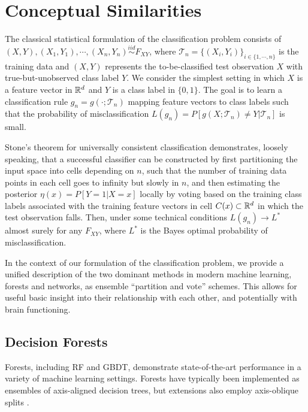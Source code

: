 
\section{Conceptual Similarities}
The classical statistical formulation of the classification problem consists of $(X,Y), (X_1,Y_1), \cdots, (X_n,Y_n) \stackrel{iid}{\sim} F_{XY}$, where $\mathcal{T}_n = \{(X_i,Y_i)\}_{i \in \{1,\cdots,n\}}$ is the training data and $(X,Y)$ represents the to-be-classified test observation $X$ with true-but-unobserved class label $Y$. We consider the simplest setting in which $X$ is a feature vector in $\mathbb{R}^d$ and $Y$ is a class label in $\{0,1\}$. The goal is to learn a classification rule $g_n = g(\cdot;\mathcal{T}_n)$ mapping feature vectors to class labels such that the probability of misclassification $L(g_n) = P[g(X;\mathcal{T}_n) \neq Y|\mathcal{T}_n]$ is small.

Stone's theorem for universally consistent classification \citep{Stone1977, DGL} demonstrates, loosely speaking, that a successful classifier can be constructed by first partitioning the input space into cells depending on $n$, such that the number of training data points in each cell goes to infinity but slowly in $n$, and then estimating the posterior 
$\eta(x) = P[Y=1|X=x]$ locally by voting based on the training class labels associated with the training feature vectors in cell $C(x) \subset \mathbb{R}^d$ in which the test observation falls.
Then, under some technical conditions $L(g_n) \to L^*$ almost surely for any $F_{XY}$, where $L^*$ is the Bayes optimal probability of misclassification.

In the context of our formulation of the classification problem,
we provide a unified description of the two dominant methods in modern machine learning, forests and networks, as ensemble ``partition and vote'' schemes.
This allows for useful basic insight into their relationship with each other, and potentially with brain functioning.

\subsection{Decision Forests}
Forests, including RF and GBDT, demonstrate state-of-the-art performance in a variety of machine learning settings.
Forests have typically been implemented as ensembles of axis-aligned decision trees, but extensions also employ axis-oblique splits \citep{Amit1997, Breiman2001, Tomita2017-mv, sporf}.

